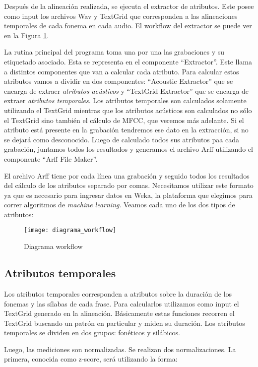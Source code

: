 Después de la alineación realizada, se ejecuta el extractor de atributos. Este posee como input los archivos Wav y TextGrid que corresponden a las alineaciones temporales de cada fonema en cada audio. El workflow del extractor se puede ver en la Figura \ref{workflow}. 

La rutina principal del programa toma una por una las grabaciones y su etiquetado asociado. Esta se representa en el componente ``Extractor''. Este llama a distintos componentes que van a calcular cada atributo. Para calcular estos atributos vamos a dividir en dos componentes: ``Acoustic Extractor'' que se encarga de extraer \textit{atributos acústicos} y ``TextGrid Extractor'' que se encarga de extraer \textit{atributos temporales}. Los atributos temporales son calculados solamente utilizando el TextGrid mientras que los atributos acústicos son calculados no sólo el TextGrid sino también el cálculo de MFCC, que veremos más adelante. Si el atributo está presente en la grabación tendremos ese dato en la extracción, si no se dejará como desconocido. Luego de calculado todos sus atributos paa cada grabación, juntamos todos los resultados y generamos el archivo Arff utilizando el componente ``Arff File Maker''.

El archivo Arff tiene por cada línea una grabación y seguido todos los resultados del cálculo de los atributos separado por comas. Necesitamos utilizar este formato ya que es necesario para ingresar datos en Weka, la plataforma que elegimos para correr algoritmos de \textit{machine learning}. Veamos cada uno de los dos tipos de atributos:

\begin{figure}[h!]
    \centerline{\texttt{[image: diagrama\_workflow]} }
    \caption{Diagrama workflow}
    \label{workflow}
\end{figure}

\subsection{Atributos temporales}

Los atributos temporales corresponden a atributos sobre la duración de los fonemas y las sílabas de cada frase. Para calcularlos utilizamos como input el TextGrid generado en la alineación. Básicamente estas funciones recorren el TextGrid buscando un patrón en particular y miden su duración. Los atributos temporales se dividen en dos grupos: fonéticos y silábicos. 

Luego, las mediciones son normalizadas. Se realizan dos normalizaciones. La primera, conocida como z-score, será utilizando la forma:


